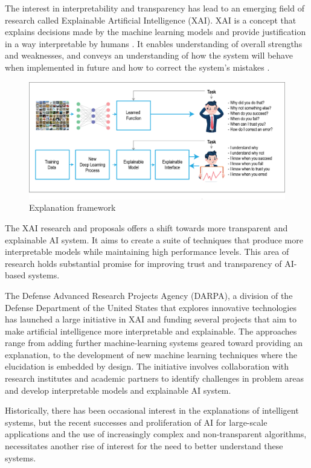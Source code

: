 The interest in interpretability and transparency has lead to an emerging field of research called Explainable Artificial Intelligence (XAI). XAI is a concept that explains decisions made by the machine learning models and provide justification in a way interpretable by humans \cite{Gunning}. It enables understanding of overall strengths and weaknesses, and conveys an understanding of how the system will behave when implemented in future and how to correct the system’s mistakes \cite{Gunning}.

\begin{figure}[htbp]
\centering
\includegraphics[width=1\textwidth]{images/XAI-concept-copy.eps}
\caption{Explanation framework}
\label{fig:Explanation framework}
\end{figure}

The XAI research and proposals offers a shift towards more transparent and explainable AI system. It aims to create a suite of techniques that produce more interpretable models while maintaining high performance levels. This area of research holds substantial promise for improving trust and transparency of AI-based systems.

The Defense Advanced Research Projects Agency (DARPA), a division of the Defense Department of the United States that explores innovative technologies has launched a large initiative in XAI and funding several projects that aim to make artificial intelligence more interpretable and explainable. The approaches range from adding further machine-learning systems geared toward providing an explanation, to the development of new machine learning techniques where the elucidation is embedded by design. The initiative involves collaboration with research institutes and academic partners to identify challenges in problem areas and develop interpretable models and explainable AI system.

Historically, there has been occasional interest in the explanations of intelligent systems\cite{Abdul}, but the recent successes and proliferation of AI for large-scale applications and the use of increasingly complex and non-transparent algorithms, necessitates another rise of interest for the need to better understand these systems.

